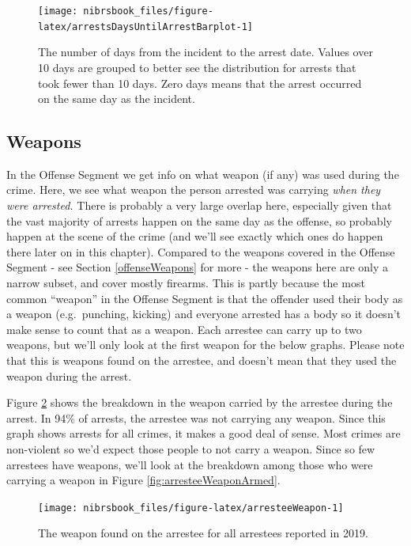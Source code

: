 \documentclass[
  12pt,
  openany]{book}
\begin{document}
\begin{figure}

{\centering \texttt{[image: nibrsbook\_files/figure-latex/arrestsDaysUntilArrestBarplot-1]} 

}

\caption{The number of days from the incident to the arrest date. Values over 10 days are grouped to better see the distribution for arrests that took fewer than 10 days. Zero days means that the arrest occurred on the same day as the incident.}\label{fig:arrestsDaysUntilArrestBarplot}
\end{figure}

\hypertarget{weapons}{%
\subsection{Weapons}\label{weapons}}

In the Offense Segment we get info on what weapon (if any) was used during the crime. Here, we see what weapon the person arrested was carrying \emph{when they were arrested.} There is probably a very large overlap here, especially given that the vast majority of arrests happen on the same day as the offense, so probably happen at the scene of the crime (and we'll see exactly which ones do happen there later on in this chapter). Compared to the weapons covered in the Offense Segment - see Section \ref{offenseWeapons} for more - the weapons here are only a narrow subset, and cover mostly firearms. This is partly because the most common ``weapon'' in the Offense Segment is that the offender used their body as a weapon (e.g.~punching, kicking) and everyone arrested has a body so it doesn't make sense to count that as a weapon. Each arrestee can carry up to two weapons, but we'll only look at the first weapon for the below graphs. Please note that this is weapons found on the arrestee, and doesn't mean that they used the weapon during the arrest.

Figure \ref{fig:arresteeWeapon} shows the breakdown in the weapon carried by the arrestee during the arrest. In 94\% of arrests, the arrestee was not carrying any weapon. Since this graph shows arrests for all crimes, it makes a good deal of sense. Most crimes are non-violent so we'd expect those people to not carry a weapon. Since so few arrestees have weapons, we'll look at the breakdown among those who were carrying a weapon in Figure \ref{fig:arresteeWeaponArmed}.

\begin{figure}

{\centering \texttt{[image: nibrsbook\_files/figure-latex/arresteeWeapon-1]} 

}

\caption{The weapon found on the arrestee for all arrestees reported in 2019.}\label{fig:arresteeWeapon}
\end{figure}
\end{document}
